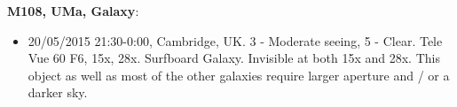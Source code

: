 {\bf M108, UMa, Galaxy}:
\begin{itemize}
\item 20/05/2015 21:30-0:00, Cambridge, UK. 3 - Moderate seeing, 5 - Clear. Tele Vue 60 F6, 15x, 28x. Surfboard Galaxy. Invisible at both 15x and 28x. This object as well as most of the other galaxies require larger aperture and / or a darker sky.
\end{itemize}
